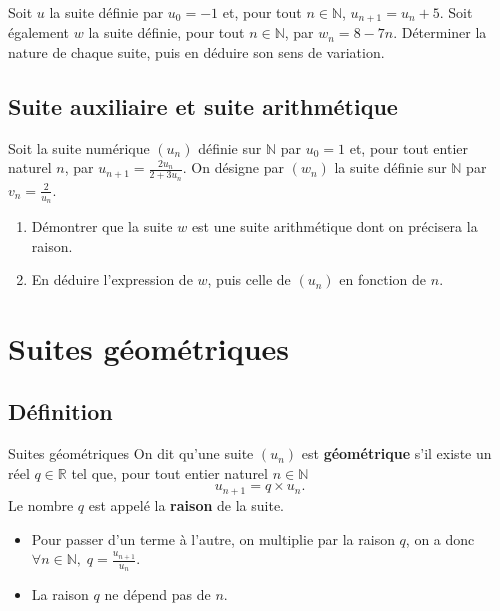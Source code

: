 \documentclass[11pt]{article}
\begin{document}
\begin{app}
  Soit $u$ la suite définie par $u_0=-1$ et, pour tout $n\in\mathbb{N}$,
  $u_{n+1}=u_n+5$. Soit également $w$ la suite définie, pour tout
  $n\in\mathbb{N}$, par $w_n = 8-7n$. Déterminer la nature de chaque suite, puis
  en déduire son sens de variation.
\end{app}

\subsection{Suite auxiliaire et suite arithmétique}
\begin{app}
  Soit la suite numérique $\left( u_n \right)$ définie sur $\mathbb{N}$ par
  $u_0=1$ et, pour tout entier naturel $n$, par $u_{n+1} = \frac{2u_n}{2+3u_n}$.
  On désigne par $\left( w_n \right)$ la suite définie sur $\mathbb{N}$ par $v_n
  = \frac{2}{u_n}$.
  \begin{enumerate}
    \item Démontrer que la suite $w$ est une suite arithmétique dont on
      précisera la raison.
    \item En déduire l'expression de $w$, puis celle de $\left( u_n \right)$ en
      fonction de $n$.
  \end{enumerate}
\end{app}

\section{Suites géométriques}
\subsection{Définition}
\begin{defi}{Suites géométriques}
  On dit qu'une suite $\left( u_n \right)$ est \textbf{géométrique} s'il existe
  un réel $q\in\mathbb{R}$ tel que, pour tout entier naturel $n\in\mathbb{N}$
  \[
    u_{n+1} = q\times u_n.
  \]
  Le nombre $q$ est appelé la \textbf{raison} de la suite.
\end{defi}

\begin{rmq}
  \begin{itemize}
    \item Pour passer d'un terme à l'autre, on multiplie par la raison $q$, on a donc
      $\forall n\in\mathbb{N},\;q=\frac{u_{n+1}}{u_n}$.
    \item La raison $q$ ne dépend pas de $n$.
  \end{itemize}
\end{rmq}
\end{document}
